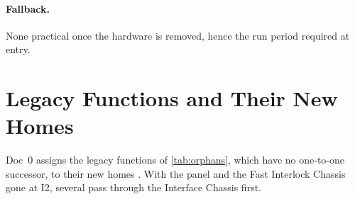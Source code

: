 \paragraph{Fallback.} None practical once the hardware is removed, hence the run
period required at entry.

\section{Legacy Functions and Their New Homes}\label{sec:orphans}

Doc~0 assigns the legacy functions of \cref{tab:orphans}, which have no one-to-one
successor, to their new homes . With the panel and the Fast Interlock Chassis gone
at I2, several pass through the Interface Chassis first.

